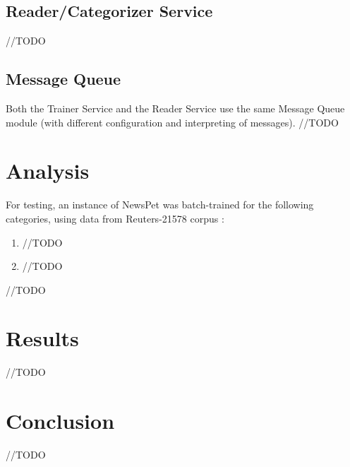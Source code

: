 \documentclass[letterpaper]{article}
\begin{document}
\subsection{Reader/Categorizer Service}
//TODO

\subsection{Message Queue}
\label{MessageQueueSection}
Both the Trainer Service and the Reader Service use the same Message Queue module (with different configuration and interpreting of messages).
//TODO

\section{Analysis}
For testing, an instance of NewsPet was batch-trained for the following categories, using data from Reuters-21578 corpus \cite{Reuters21578}:
\begin{enumerate}
\item //TODO
\item //TODO
\end{enumerate}
//TODO


\section{Results}
//TODO

\section{Conclusion}
//TODO




\end{document}
